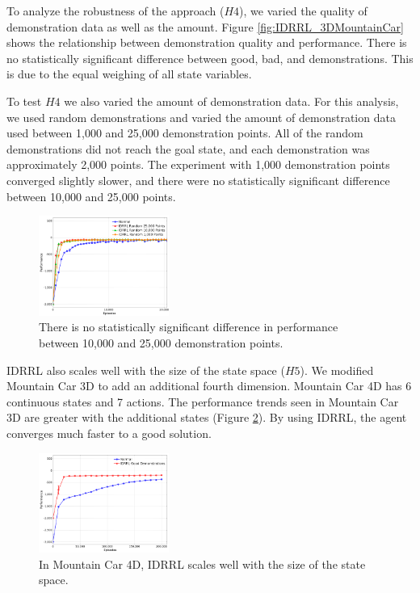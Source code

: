 \documentclass[10pt,a4paper]{article}
\begin{document}
To analyze the robustness of the approach ($H4$), we varied the quality of demonstration data as well as the amount. Figure \ref{fig:IDRRL_3DMountainCar} shows the relationship between demonstration quality and performance. There is no statistically significant difference between good, bad, and demonstrations. This is due to the equal weighing of all state variables.

To test $H4$ we also varied the amount of demonstration data. For this analysis, we used random demonstrations and varied the amount of demonstration data used between 1,000 and 25,000 demonstration points. All of the random demonstrations did not reach the goal state, and each demonstration was approximately 2,000 points. The experiment with 1,000 demonstration points converged slightly slower, and there were no statistically significant difference between 10,000 and 25,000 points.

\begin{figure}[h!]
  \centering
      \includegraphics[width=0.38\textwidth]{IDRRL_Points_3DMountainCar}
  \caption{There is no statistically significant difference in performance between 10,000 and 25,000 demonstration points. }
  \label{fig:MC3D_GoodVarious}
\end{figure}


IDRRL also scales well with the size of the state space ($H5$). We modified Mountain Car 3D to add an additional fourth dimension. Mountain Car 4D has 6 continuous states and 7 actions. The performance trends seen in Mountain Car 3D are greater with the additional states (Figure \ref{fig:IDRRL_4DMountainCar}). By using IDRRL, the agent converges much faster to a good solution.

\begin{figure}[h!]
  \centering
      \includegraphics[width=0.38\textwidth]{IDRRL_4DMountainCar}
  \caption{In Mountain Car 4D, IDRRL scales well with the size of the state space.}
  \label{fig:IDRRL_4DMountainCar}
\end{figure}
\end{document}
